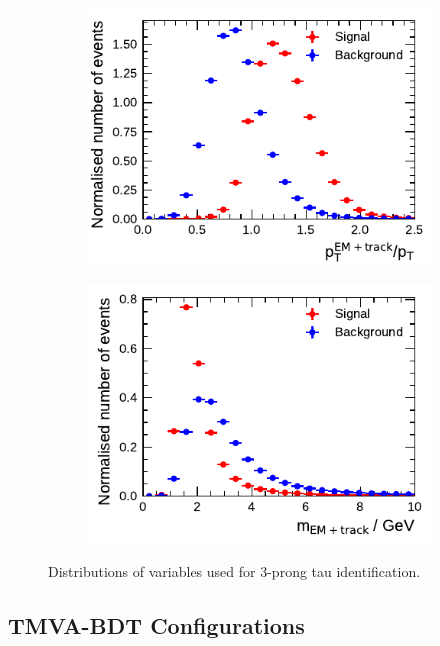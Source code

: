 \begin{figure}[htbp]
\begin{subfigure}{0.5\textwidth}
  \end{subfigure}%
  \begin{subfigure}{0.5\textwidth}
    \centering
    \includegraphics{./figures/baseline_bdt_vars/3p/ptRatioEflowApprox.pdf}
  \end{subfigure}
  \begin{subfigure}{0.5\textwidth}
    \centering
    \includegraphics{./figures/baseline_bdt_vars/3p/mEflowApprox.pdf}
  \end{subfigure}
  \caption[]{Distributions of variables used for 3-prong tau identification.}
\end{figure}

\FloatBarrier
\subsection{TMVA-BDT Configurations}
\label{app:tmva_config}

